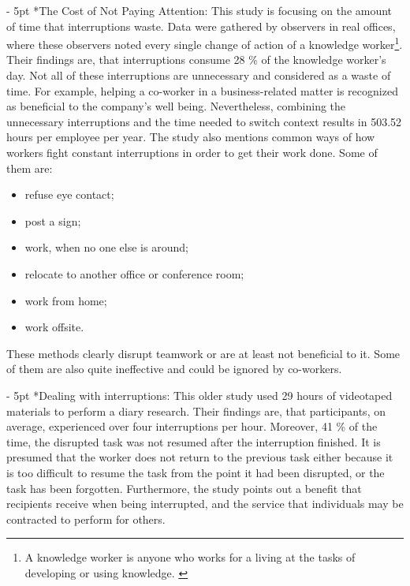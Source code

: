 \documentclass[11pt,singleside]{myfithesis2}
\makeatletter
\renewcommand\paragraph{
   \vspace{-10pt}
   \@startsection{paragraph}{4}{0mm}
      {\baselineskip}
      {- 5pt}
      {\normalfont\normalsize\bfseries}
}
\makeatother
\begin{document}
\paragraph*{The Cost of Not Paying Attention: } This study \cite{studyAttention} is focusing on the amount of time that interruptions waste. Data were gathered by observers in real offices, where these observers noted every single change of action of a knowledge worker\footnote{A knowledge worker is anyone who works for a living at the tasks of developing or using knowledge. \cite{knowledgeWorker}}. Their findings are, that interruptions consume 28 \% of the knowledge worker's day. Not all of these interruptions are unnecessary and considered as a waste of time. For example, helping a co-worker in a business-related matter is recognized as beneficial to the company's well being. Nevertheless, combining the unnecessary interruptions and the time needed to switch context results in 503.52 hours per employee per year. The study also mentions common ways of how workers fight constant interruptions in order to get their work done. Some of them are: \label{list:avoidingCommunication}
\begin{itemize}
	\item refuse eye contact;
	\item post a sign;
	\item work, when no one else is around;
	\item relocate to another office or conference room;
	\item work from home;
	\item work offsite.
\end{itemize}
These methods clearly disrupt teamwork or are at least not beneficial to it. Some of them are also quite ineffective and could be ignored by co-workers.
\paragraph*{Dealing with interruptions: } This older study \cite{studyDealingWithInterruptions} used 29 hours of videotaped materials to perform a diary research. Their findings are, that participants, on average, experienced over four interruptions per hour. Moreover, 41 \% of the time, the disrupted task was not resumed after the interruption finished. It is presumed that the worker does not return to the previous task either because it is too difficult to resume the task from the point it had been disrupted, or the task has been forgotten. Furthermore, the study points out a benefit that recipients receive when being interrupted, and the service that individuals may be contracted to perform for others.
\end{document}
